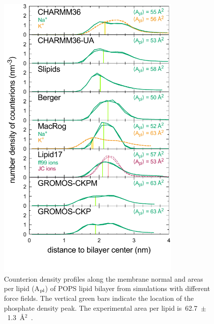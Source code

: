 \documentclass[journal=jpcbfk,manuscript=article]{achemso}
\begin{document}
\begin{figure}[!htb]
  \centering
  \includegraphics[width=9.0cm]{../Figs/NAdensPOPSformatted.pdf}
  \caption{\label{NAdensPOPS}
    Counterion density profiles along the membrane normal and areas per lipid (A$_{\rm pl}$)
    of POPS lipid bilayer from simulations with different force fields.
    The vertical green bars indicate the location of the phosphate density peak.
    The experimental area per lipid is~62.7~$\pm$~1.3~\AA$^2$~\cite{pan14}.
  }
\end{figure}
\end{document}
